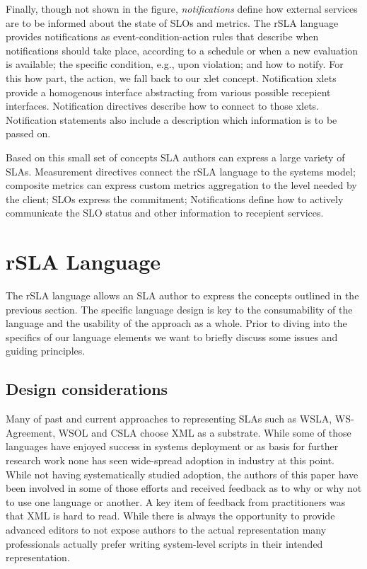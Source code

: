 Finally, though not shown in the figure, {\em notifications} define how external services are to be informed about the state of SLOs and metrics. The rSLA language provides notifications as event-condition-action rules that describe when notifications should take place, according to a schedule or when a new evaluation is available; the specific condition, e.g., upon violation; and how to notify. For this how part, the action, we fall back to our xlet concept. Notification xlets provide a homogenous interface abstracting from various possible recepient interfaces. Notification directives describe how to connect to those xlets. Notification statements also include a description which information is to be passed on.

Based on this small set of concepts SLA authors can express a large variety of SLAs. Measurement directives connect the rSLA language to the systems model; composite metrics can express custom metrics aggregation to the level needed by the client; SLOs express the commitment; Notifications define how to actively communicate the SLO status and other information to recepient services.



\section{rSLA Language}\label{language}

The rSLA language allows an SLA author to express the concepts outlined in the previous section. The specific language design is key to the consumability of the language and the usability of the approach as a whole. Prior to diving into the specifics of our language elements we want to briefly discuss some issues and guiding principles.

\subsection{Design considerations}

Many of past and current approaches to representing SLAs such as WSLA, WS-Agreement, WSOL and CSLA choose XML as a substrate. While some of those languages have enjoyed success in systems deployment or as basis for further research work none has seen wide-spread adoption in industry at this point. While not having systematically studied adoption, the authors of this paper have been involved in some of those efforts and received feedback as to why or why not to use one language or another. A key item of feedback from practitioners was that XML is hard to read. While there is always the opportunity to provide advanced editors to not expose authors to the actual representation many professionals actually prefer writing system-level scripts in their intended representation.

